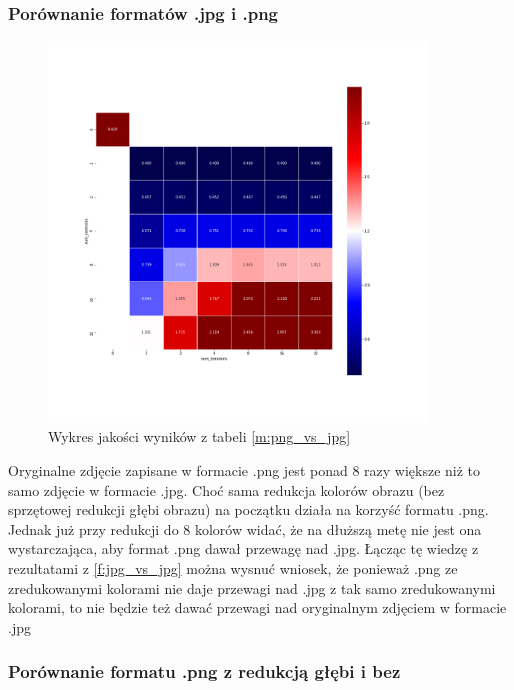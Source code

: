 \subsubsection{Porównanie formatów .jpg i .png}
\label{f:png_vs_jpg}

\begin{figure}[H]
	\includegraphics[width=0.9\textwidth]{photos/plots/png_vs_jpg}
    \caption{Wykres jakości wyników z tabeli \ref{m:png_vs_jpg}}
\end{figure}

Oryginalne zdjęcie zapisane w formacie .png jest ponad 8 razy większe niż to samo zdjęcie w formacie .jpg.
Choć sama redukcja kolorów obrazu (bez sprzętowej redukcji głębi obrazu) na początku działa na korzyść formatu .png. Jednak już przy redukcji do 8 kolorów widać, że na dłuższą metę nie jest ona wystarczająca, aby format .png dawał przewagę nad .jpg. Łącząc tę wiedzę z rezultatami z \ref{f:jpg_vs_jpg} można wysnuć wniosek, że ponieważ .png ze zredukowanymi kolorami nie daje przewagi nad .jpg z tak samo zredukowanymi kolorami, to nie będzie też dawać przewagi nad oryginalnym zdjęciem w formacie .jpg

\subsubsection{Porównanie formatu .png z redukcją głębi i bez}
\label{f:red_vs_png}

